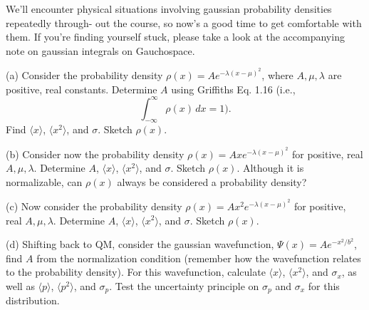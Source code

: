 \documentclass{article}
\begin{document}
\hfil

\begin{ques}\label{q2}
We’ll encounter physical situations involving gaussian probability densities repeatedly through-
out the course, so now’s a good time to get comfortable with them. If you’re finding yourself
stuck, please take a look at the accompanying note on gaussian integrals on Gauchospace.

(a) Consider the probability density $\rho(x) = A e^{-\lambda(x-\mu)^2}$, where $A,\mu, \lambda$ are positive, real
constants. Determine $A$ using Griffiths Eq. 1.16 (i.e.,
\[
\int_{-\infty}^\infty \rho(x) \, dx = 1).
\]
Find $\langle x\rangle$, $\langle x^2\rangle$, and $\sigma$. Sketch $\rho(x)$.

(b) Consider now the probability density $\rho(x) = A x e^{-\lambda(x-\mu)^2}$ for positive, real $A,\mu, \lambda$.
Determine $A$, $\langle x\rangle$, $\langle x^2\rangle$, and $\sigma$. Sketch $\rho(x)$. Although it is normalizable, can $\rho(x)$
always be considered a probability density?

(c) Now consider the probability density $\rho(x) = A x^2 e^{-\lambda(x-\mu)^2}$ for positive, real $A,\mu, \lambda$.
Determine $A$, $\langle x\rangle$, $\langle x^2\rangle$, and $\sigma$. Sketch $\rho(x)$.

(d) Shifting back to QM, consider the gaussian wavefunction, $\Psi(x) = A e^{-x^2/b^2}$, find $A$
from the normalization condition (remember how the wavefunction relates to the
probability density). For this wavefunction, calculate $\langle x\rangle$, $\langle x^2\rangle$, and $\sigma_x$, as well as
$\langle p\rangle$, $\langle p^2\rangle$, and $\sigma_p$. Test the uncertainty principle on $\sigma_p$ and $\sigma_x$ for this distribution.
\end{ques}
\end{document}
